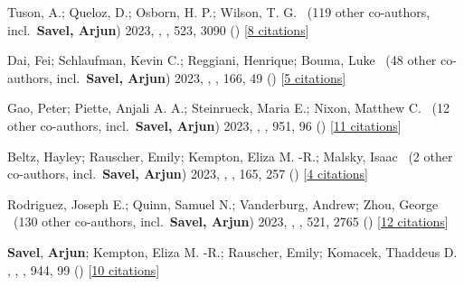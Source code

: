 \item[{\color{numcolor}\scriptsize25}] Tuson, A.; Queloz, D.; Osborn, H. P.; Wilson, T. G. \etal\ ({119} other co-authors, incl.\ \textbf{Savel, Arjun}) 2023, , \mnras, {523}, 3090 () [\href{https://ui.adsabs.harvard.edu/abs/2023MNRAS.523.3090T}{8 citations}]

\item[{\color{numcolor}\scriptsize24}] Dai, Fei; Schlaufman, Kevin C.; Reggiani, Henrique; Bouma, Luke \etal\ ({48} other co-authors, incl.\ \textbf{Savel, Arjun}) 2023, , \aj, {166}, 49 () [\href{https://ui.adsabs.harvard.edu/abs/2023AJ....166...49D}{5 citations}]

\item[{\color{numcolor}\scriptsize23}] Gao, Peter; Piette, Anjali A. A.; Steinrueck, Maria E.; Nixon, Matthew C. \etal\ ({12} other co-authors, incl.\ \textbf{Savel, Arjun}) 2023, , \apj, {951}, 96 () [\href{https://ui.adsabs.harvard.edu/abs/2023ApJ...951...96G}{11 citations}]

\item[{\color{numcolor}\scriptsize22}] Beltz, Hayley; Rauscher, Emily; Kempton, Eliza M. -R.; Malsky, Isaac \etal\ ({2} other co-authors, incl.\ \textbf{Savel, Arjun}) 2023, , \aj, {165}, 257 () [\href{https://ui.adsabs.harvard.edu/abs/2023AJ....165..257B}{4 citations}]

\item[{\color{numcolor}\scriptsize21}] Rodriguez, Joseph E.; Quinn, Samuel N.; Vanderburg, Andrew; Zhou, George \etal\ ({130} other co-authors, incl.\ \textbf{Savel, Arjun}) 2023, , \mnras, {521}, 2765 () [\href{https://ui.adsabs.harvard.edu/abs/2023MNRAS.521.2765R}{12 citations}]

\item[{\color{numcolor}\scriptsize20}] \textbf{Savel}, \textbf{Arjun}; Kempton, Eliza M. -R.; Rauscher, Emily; Komacek, Thaddeus D. , , \apj, {944}, 99 () [\href{https://ui.adsabs.harvard.edu/abs/2023ApJ...944...99S}{10 citations}]

